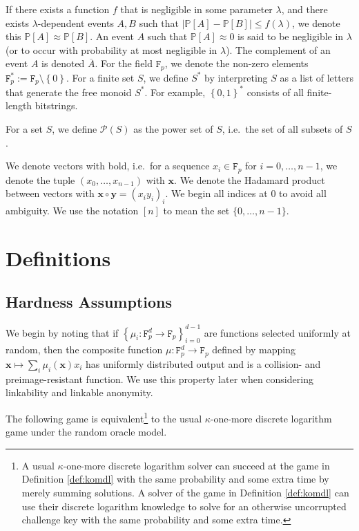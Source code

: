 \documentclass{llncs}
\newcommand{\F}{\texttt{F}_p}
\newcommand{\prob}{\mathbb{P}}
\begin{document}
If there exists a function $f$ that is negligible in some parameter $\lambda$, and there exists $\lambda$-dependent events $A, B$ such that $\left|\prob\left[A\right] - \prob\left[B\right]\right| \leq f(\lambda)$, we denote this $\prob\left[A\right] \approx \prob\left[B\right]$. An event $A$ such that $\prob\left[A\right] \approx 0$ is said to be negligible in $\lambda$ (or to occur with probability at most negligible in $\lambda$). The complement of an event $A$ is denoted $\overline{A}$. For the field $\F$, we denote the non-zero elements $\F^* := \F\setminus \left\{0\right\}$. For a finite set $S$, we define $S^*$ by interpreting $S$ as a list of letters that generate the free monoid $S^*$. For example, $\left\{0,1\right\}^*$ consists of all finite-length bitstrings.

For a set $S$, we define $\mathcal{P}(S)$ as the power set of $S$, i.e.\ the set of all subsets of $S$.

We denote vectors with bold, i.e.\ for a sequence $x_i \in \F$ for $i = 0, \ldots, n-1$, we denote the tuple $(x_0, \ldots, x_{n-1})$ with $\textbf{x}$. We denote the Hadamard product between vectors with $\textbf{x} \circ \textbf{y} = (x_i y_i)_i$. We begin all indices at $0$ to avoid all ambiguity. We use the notation $[n]$ to mean the set $\{0,\ldots,n-1\}$.


\section{Definitions}

\subsection{Hardness Assumptions}\label{sec:hardness}

We begin by noting that if $\left\{\mu_i: \F^d \to \F\right\}_{i=0}^{d-1}$ are functions selected uniformly at random, then the composite function $\mu: \F^d \to \F$ defined by mapping $\textbf{x} \mapsto \sum_i \mu_i(\textbf{x}) x_i$ has uniformly distributed output and is a collision- and preimage-resistant function. We use this property later when considering linkability and linkable anonymity.

The following game is equivalent\footnote{A usual $\kappa$-one-more discrete logarithm solver can succeed at the game in Definition \ref{def:komdl} with the same probability and some extra time by merely summing solutions. A solver of the game in Definition \ref{def:komdl} can use their discrete logarithm knowledge to solve for an otherwise uncorrupted challenge key with the same probability and some extra time.} to the usual $\kappa$-one-more discrete logarithm game under the random oracle model.
\end{document}

